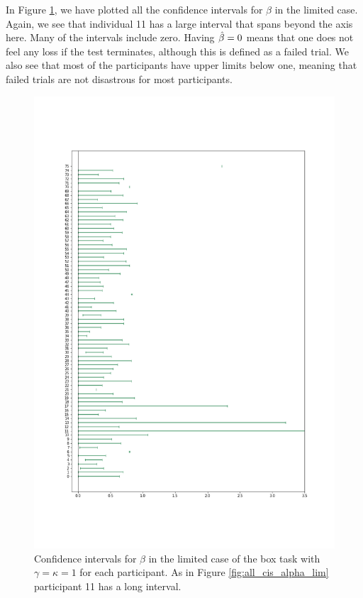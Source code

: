 In Figure \ref{fig:all_cis_beta}, we have plotted all the confidence intervals for $\beta$ in the limited case. Again, we see that individual 11 has a large interval that spans beyond the axis here. Many of the intervals include zero. Having $\hat{\beta}=0$ means that one does not feel any loss if the test terminates, although this is defined as a failed trial. We also see that most of the participants have upper limits below one, meaning that failed trials are not disastrous for most participants. 
\begin{figure}
    \centering
    \includegraphics[scale=0.38]{pictures/all_cis_lim_beta.png}
    \caption[CIs for $\beta$, limited. $\gamma=\kappa=1$]{Confidence intervals for $\beta$ in the limited case of the box task with $\gamma=\kappa=1$ for each participant. As in Figure \ref{fig:all_cis_alpha_lim} participant 11 has a long interval.}
    \label{fig:all_cis_beta}
\end{figure}

